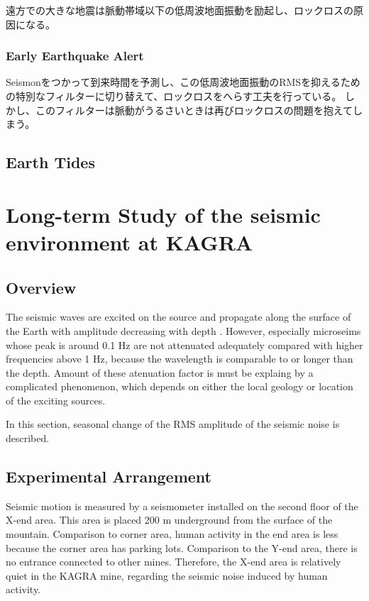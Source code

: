 遠方での大きな地震は脈動帯域以下の低周波地面振動を励起し、ロックロスの原因になる。
\subsubsection{Early Earthquake Alert}
Seismonをつかって到来時間を予測し、この低周波地面振動のRMSを抑えるための特別なフィルターに切り替えて、ロックロスをへらす工夫を行っている。
しかし、このフィルターは脈動がうるさいときは再びロックロスの問題を抱えてしまう。
\subsection{Earth Tides}

\newpage
\section{Long-term Study of the seismic environment at KAGRA}
\subsection{Overview}
The seismic waves are excited on the source and propagate along the surface of the Earth with amplitude decreasing with depth \cite{carter1991high}. However, especially microseims whose peak is around 0.1 $\mathrm{Hz}$ are not attenuated adequately compared with higher frequencies above 1 $\mathrm{Hz}$, because the wavelength is comparable to or longer than the depth. Amount of these atenuation factor is must be explaing by a complicated phenomenon, which depends on either the local geology or location of the exciting sources. 

In this section, seasonal change of the RMS amplitude of the seismic noise is described.


\subsection{Experimental Arrangement}
Seismic motion is measured by a seismometer installed on the second floor of the X-end area. This area is placed 200 $\mathrm{m}$ underground from the surface of the mountain. Comparison to corner area, human activity in the end area is less because the corner area has parking lots. Comparison to the Y-end area, there is no entrance connected to other mines. Therefore, the X-end area is relatively quiet in the KAGRA mine, regarding the seismic noise induced by human activity.

